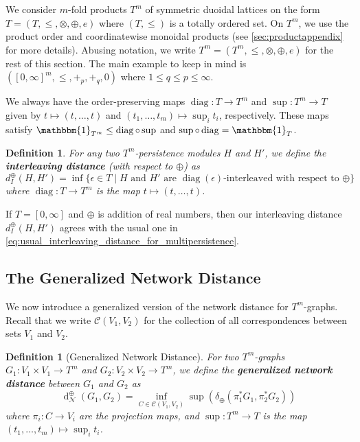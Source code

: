 \documentclass[a4paper,11pt]{article}
\newcommand{\Id}{\mathbbm{1}}
\newcommand{\tensor}{\otimes}
\newcommand{\atensor}{\oplus}
\DeclareMathOperator{\diag}{diag}
\DeclareMathOperator{\supa}{sup}
\newcounter{dummy}\numberwithin{dummy}{section}
\newtheorem{definition}[dummy]{Definition}
\theoremstyle{remark}
\begin{document}
We consider $m$-fold products $T^m$ of symmetric duoidal lattices on the form $T=(T,\leq,\tensor,\atensor,e)$ where $(T,\leq)$ is a totally ordered set. On $T^m$, we use the product order and coordinatewise monoidal products (see \cref{sec:productappendix} for more details). Abusing notation, we write $T^m=(T^m,\leq,\tensor,\atensor,e)$ for the rest of this section. The main example to keep in mind is $([0,\infty]^m,\leq,+_p,+_q,0)$ where $1\leq q\leq p\leq\infty$.

We always have the order-preserving maps $\diag\colon T\to T^m$ and $\supa\colon T^m\to T$ given by $t\mapsto(t,\ldots,t)$ and $(t_1,\ldots,t_m)\mapsto\sup_i t_i$, respectively. These maps satisfy $\Id_{T^m}\leq \diag\circ \supa$ and $\supa\circ \diag=\Id_T$.

\begin{definition}
For any two $T^m$-persistence modules $H$ and $H'$, we define the \textbf{interleaving distance} (with respect to $\atensor$) as
\begin{equation*}
    d_I^\atensor(H,H')=\inf\{\epsilon\in T\mid H\text{ and }H'\text{ are }\diag(\epsilon)\text{-interleaved with respect to }\atensor\}
\end{equation*}
where $\diag\colon T\to T^m$ is the map $t\mapsto(t,\ldots,t)$.
\end{definition}

If $T=[0,\infty]$ and $\atensor$ is addition of real numbers, then our interleaving distance $d_I^\atensor(H,H')$ agrees with the usual one in \cref{eq:usual_interleaving_distance_for_multipersistence}.

\subsection{The Generalized Network Distance}\label{sec:generalized_network_distance}

We now introduce a generalized version of the network distance for $T^m$-graphs. Recall that we write $\mathcal{C}(V_1, V_2)$ for the collection of all correspondences between sets $V_1$ and $V_2$.

\begin{definition}[Generalized Network Distance]
For two $T^m$-graphs $G_1\colon V_1\times V_1\to T^m$ and $G_2\colon V_2\times V_2\to T^m$, we define the \textbf{generalized network distance} between $G_1$ and $G_2$ as
\begin{equation}\label{eq:generalized_network_distance}
\operatorname{d}^\atensor_{\mathcal{N}}(G_1, G_2)=\inf_{C\in\mathcal{C}(V_1, V_2)}\supa(\delta_\atensor(\pi_1^*G_1, \pi_2^*G_2))
\end{equation}
where $\pi_i\colon C\to V_i$ are the projection maps, and $\supa\colon T^m\to T$ is the map $(t_1,\ldots,t_m)\mapsto\sup_i t_i$.
\end{definition}
\end{document}
